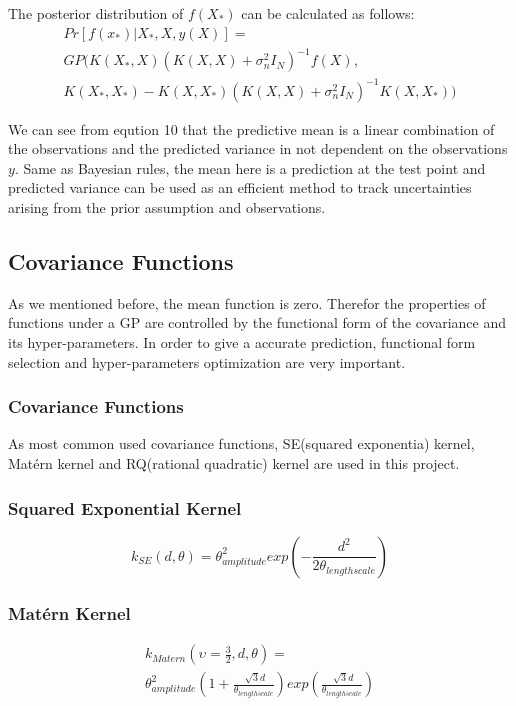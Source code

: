 \documentclass[conference]{IEEEtran}
\begin{document}
The posterior distribution of $f(X_*)$ can be calculated as follows:
\begin{multline}
  Pr[f(x_*)|X_*,X,y(X)]=\\GP( K(X_*,X)(K(X,X)+ \sigma_n^2 I_N)^{-1} f(X), \\
  K(X_*,X_*)- K(X,X_*)(K(X,X)+ \sigma_n^2 I_N)^{-1} K(X,X_*))
\end{multline}

We can see from eqution 10 that the predictive mean is a linear combination of the observations and the predicted variance in not dependent on the observations $y$. Same as Bayesian rules, the mean here is a prediction at the test point and predicted variance can be used as an efficient method to track uncertainties arising from the prior assumption and observations\cite{shah2014student}.

\subsection{Covariance Functions}
As we mentioned before, the mean function is zero. Therefor the properties of functions under a GP are controlled by the functional form of the covariance and its hyper-parameters\cite{rasmussen2004gaussian}. In order to give a accurate prediction, functional form selection and  hyper-parameters optimization are very important.

\subsubsection{Covariance Functions} As most common used covariance functions, SE(squared exponentia) kernel, Matérn kernel and RQ(rational quadratic) kernel are used in this project.
\subsubsection*{Squared Exponential Kernel} 
\begin{equation}
  k_{SE}(d,\theta) =\theta_{amplitude}^2 exp(-\frac{d^2}{2\theta_{lengthscale}})
\end{equation}
\subsubsection*{Matérn Kernel} 
\begin{multline}
   k_{Matern}(\upsilon=\frac{3}{2},d,\theta) =\\ \theta_{amplitude}^2 (1+\frac{\sqrt[]{3}d}{\theta_{lengthscale}})exp(\frac{\sqrt[]{3}d}{\theta_{lengthscale}})
\end{multline}
\end{document}
